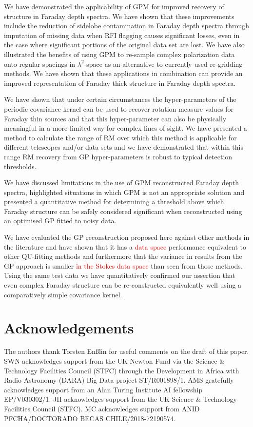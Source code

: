 \documentclass[fleqn,usenatbib]{mnras}
\begin{document}
We have demonstrated the applicability of GPM for improved recovery of structure in Faraday depth spectra. We have shown that these improvements include the reduction of sidelobe contamination in Faraday depth spectra through imputation of missing data when RFI flagging causes significant losses, even in the case where significant portions of the original data set are lost. We have also illustrated the benefits of using GPM to re-sample complex polarization data onto regular spacings in $\lambda^2$-space as an alternative to currently used re-gridding methods. We have shown that these applications in combination can provide an improved representation of Faraday thick structure in Faraday depth spectra.

We have shown that under certain circumstances the hyper-parameters of the periodic covariance kernel can be used to recover rotation measure values for Faraday thin sources and that this hyper-parameter can also be physically meaningful in a more limited way for complex lines of sight. We have presented a method to calculate the range of RM over which this method is applicable for different telescopes and/or data sets and we have demonstrated that within this range RM recovery from GP hyper-parameters is robust to typical detection thresholds.


We have discussed limitations in the use of GPM reconstructed Faraday depth spectra, highlighted situations in which GPM is not an appropriate solution and presented a quantitative method for determining a threshold above which Faraday structure can be safely considered significant when reconstructed using an optimised GP fitted to noisy data.

We have evaluated the GP reconstruction proposed here against other methods in the literature and have shown that it has a \textcolor{red}{data space} performance equivalent to other QU-fitting methods and furthermore that the variance in results from the GP approach is smaller \textcolor{red}{in the Stokes data space} than seen from those methods. Using the same test data we have quantitatively confirmed our assertion that even complex Faraday structure can be re-constructed equivalently well using a comparatively simple covariance kernel.


\section*{Acknowledgements}

The authors thank Torsten En{\ss}lin for useful comments on the draft of this paper. SWN acknowledges support from the UK Newton Fund via the Science \& Technology Facilities Council (STFC) through the Development in Africa with Radio Astronomy (DARA) Big Data project ST/R001898/1. AMS gratefully acknowledges support from an Alan Turing Institute AI fellowship EP/V030302/1. JH acknowledges support from the UK Science \& Technology Facilities Council (STFC). MC acknowledges support from ANID PFCHA/DOCTORADO BECAS CHILE/2018-72190574.
\end{document}
